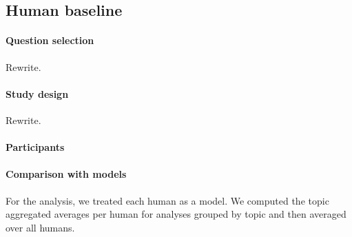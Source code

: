 \documentclass[11pt, oneside]{article}
\begin{document}
\begin{refsection}
\subsection{Human baseline}


\paragraph{Question selection} \label{sec:subset-selection}
Rewrite.

\paragraph{Study design}
Rewrite.

\paragraph{Participants}


\paragraph{Comparison with models}
For the analysis, we treated each human as a model. We computed the topic aggregated averages per human for analyses grouped by topic and then averaged over all humans.


\end{refsection}
\end{document}
